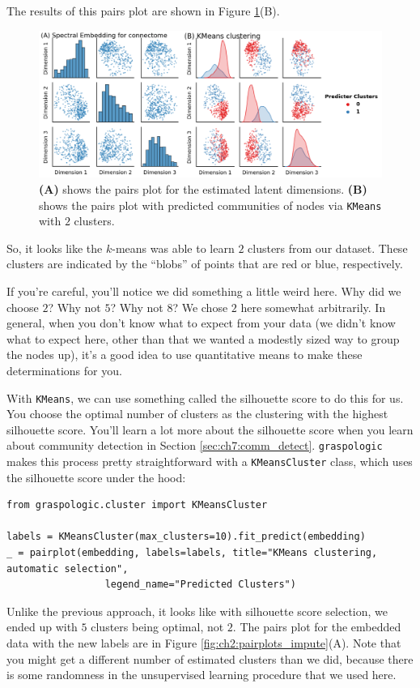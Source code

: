 The results of this pairs plot are shown in Figure \ref{fig:ch2:pairplots}(B).
\begin{figure}
    \centering
    \includegraphics[width=\linewidth]{foundations/ch2/Images/pairplots.png}
    \caption[The pairs plot for embedded connectomes]{\textbf{(A)} shows the  pairs plot for the estimated latent dimensions. \textbf{(B)} shows the  pairs plot with predicted communities of nodes via \texttt{KMeans} with $2$ clusters.}
    \label{fig:ch2:pairplots}
\end{figure}
So, it looks like the $k$-means was able to learn $2$ clusters from our dataset. These clusters are indicated by the ``blobs'' of points that are red or blue, respectively.

If you're careful, you'll notice we did something a little weird here. Why did we choose $2$? Why not $5$? Why not $8$? We chose $2$ here somewhat arbitrarily. In general, when you don't know what to expect from your data (we didn't know what to expect here, other than that we wanted a modestly sized way to group the nodes up), it's a good idea to use quantitative means to make these determinations for you. 

With \texttt{KMeans}, we can use something called the silhouette score to do this for us. You choose the optimal number of clusters as the clustering with the highest silhouette score. You'll learn a lot more about the silhouette score when you learn about community detection in Section \ref{sec:ch7:comm_detect}. \texttt{graspologic} makes this process pretty straightforward with a \texttt{KMeansCluster} class, which uses the silhouette score under the hood:

\begin{lstlisting}[style=python]
from graspologic.cluster import KMeansCluster

labels = KMeansCluster(max_clusters=10).fit_predict(embedding)
_ = pairplot(embedding, labels=labels, title="KMeans clustering, automatic selection", 
                 legend_name="Predicted Clusters")
\end{lstlisting}
Unlike the previous approach, it looks like with silhouette score selection, we ended up with $5$ clusters being optimal, not $2$. The pairs plot for the embedded data with the new labels are in Figure \ref{fig:ch2:pairplots_impute}(A). Note that you might get a different number of estimated clusters than we did, because there is some randomness in the unsupervised learning procedure that we used here.


